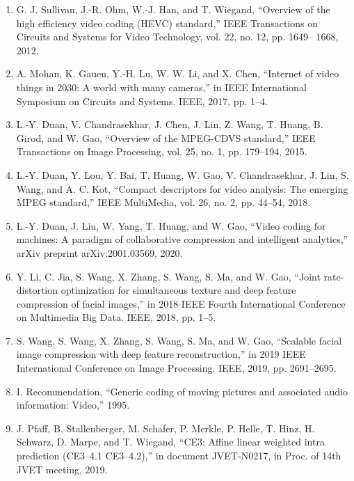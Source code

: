 \documentclass{article}
\begin{document}
\begin{enumerate}
	\item G. J. Sullivan, J.-R. Ohm, W.-J. Han, and T. Wiegand, “Overview of the
	high efficiency video coding (HEVC) standard,” IEEE Transactions on
	Circuits and Systems for Video Technology, vol. 22, no. 12, pp. 1649–
	1668, 2012.
	
	\item A. Mohan, K. Gauen, Y.-H. Lu, W. W. Li, and X. Chen, “Internet
	of video things in 2030: A world with many cameras,” in IEEE
	International Symposium on Circuits and Systems. IEEE, 2017, pp.
	1–4.
	
	\item L.-Y. Duan, V. Chandrasekhar, J. Chen, J. Lin, Z. Wang, T. Huang,
	B. Girod, and W. Gao, “Overview of the MPEG-CDVS standard,” IEEE
	Transactions on Image Processing, vol. 25, no. 1, pp. 179–194, 2015.
	
	\item L.-Y. Duan, Y. Lou, Y. Bai, T. Huang, W. Gao, V. Chandrasekhar, J. Lin,
	S. Wang, and A. C. Kot, “Compact descriptors for video analysis: The
	emerging MPEG standard,” IEEE MultiMedia, vol. 26, no. 2, pp. 44–54,
	2018.
	
	\item L.-Y. Duan, J. Liu, W. Yang, T. Huang, and W. Gao, “Video coding
	for machines: A paradigm of collaborative compression and intelligent
	analytics,” arXiv preprint arXiv:2001.03569, 2020.	

	\item Y. Li, C. Jia, S. Wang, X. Zhang, S. Wang, S. Ma, and W. Gao, “Joint
	rate-distortion optimization for simultaneous texture and deep feature
	compression of facial images,” in 2018 IEEE Fourth International
	Conference on Multimedia Big Data. IEEE, 2018, pp. 1–5.

	\item S. Wang, S. Wang, X. Zhang, S. Wang, S. Ma, and W. Gao, “Scalable
	facial image compression with deep feature reconstruction,” in 2019
	IEEE International Conference on Image Processing. IEEE, 2019, pp.
	2691–2695.

	\item I. Recommendation, “Generic coding of moving pictures and associated
	audio information: Video,” 1995.

	\item J. Pfaff, B. Stallenberger, M. Schafer, P. Merkle, P. Helle, T. Hinz,
	H. Schwarz, D. Marpe, and T. Wiegand, “CE3: Affine linear weighted
	intra prediction (CE3–4.1 CE3–4.2),” in document JVET-N0217, in Proc.
	of 14th JVET meeting, 2019.


\end{enumerate}
\end{document}
